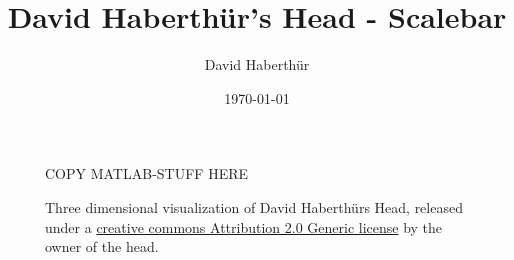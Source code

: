 \documentclass{article}
\begin{document}
\author{David Haberthür}
\title{David Haberthür's Head - Scalebar}
\date{\today}
\maketitle
\begin{figure}[h]
	\centering
    COPY MATLAB-STUFF HERE
	\caption{Three dimensional visualization of David Haberthürs Head, released under a \href{http://creativecommons.org/licenses/by/2.0/deed.en_GB}{creative commons Attribution 2.0 Generic license} by the owner of the head.}
	\label{fig:head}
\end{figure}
\end{document}
